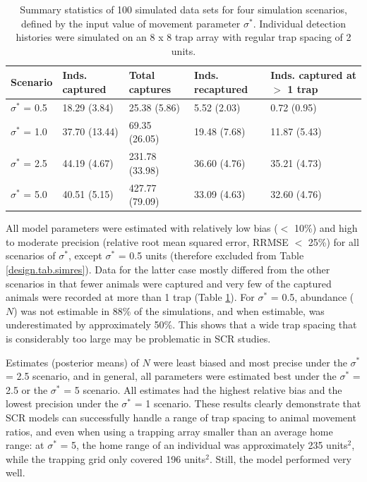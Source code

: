 \begin{table}[ht]
  \centering
  \caption{Summary statistics of 100 simulated data sets for four
    simulation scenarios, defined by the input value of movement
    parameter $\sigma^*$. Individual detection histories were
    simulated on an 8 x 8 trap array with regular trap spacing of 2
    units.}
    \begin{tabular}{l p{2.1cm} p{2.3cm}p{2.1cm}p{2.3cm}}
    \hline
    Scenario & Inds. \newline captured & Total \newline captures & Inds. \newline recaptured & Inds. captured  \newline at $>$ 1 trap \\ \hline
    {$\sigma^*$ = 0.5} & 18.29 (3.84) & 25.38 (5.86) & 5.52 (2.03) & 0.72 (0.95) \\
    {$\sigma^*$ = 1.0} & 37.70 (13.44) & 69.35 (26.05) & 19.48 (7.68) & 11.87 (5.43) \\
    {$\sigma^*$ = 2.5} & 44.19 (4.67) & 231.78 (33.98) & 36.60 (4.76) & 35.21 (4.73) \\
    {$\sigma^*$ = 5.0} & 40.51 (5.15) & 427.77 (79.09) & 33.09 (4.63)
    & 32.60 (4.76) \\ \hline
    \end{tabular}
  \label{design.tab.simdat}
\end{table}

All model parameters were
estimated with relatively
low bias ($<$ 10\%) and high to moderate precision (relative root
mean squared error, RRMSE $<$ 25\%)
for all scenarios of $\sigma^*$, except $\sigma^*$ = 0.5 units
(therefore excluded 
from Table \ref{design.tab.simres}). Data for the
latter case mostly differed from the other scenarios in that fewer
animals were captured and very few of the captured animals were
recorded at more than 1 trap (Table \ref{design.tab.simdat}). For
$\sigma^*$ = 0.5, abundance ($N$) was not
estimable 
in 88\% of the
simulations, and when estimable, was underestimated by
approximately 50\%. This shows that a wide trap spacing that is
considerably too large may be problematic in SCR studies.

Estimates (posterior means)
of $N$ were least biased and most precise under the
$\sigma^*$ = 2.5 scenario, and in general, all parameters were
estimated best under the $\sigma^*$ = 2.5 or the $\sigma^*$ = 5
scenario. All estimates had the highest relative bias and the lowest
precision under the $\sigma^*$ = 1 scenario.  These results clearly
demonstrate that SCR models can successfully handle a range of trap
spacing to animal movement ratios, and even when using a trapping
array smaller than an average home range: at $\sigma^*$ = 5, the home
range of an individual was approximately 235 units$^2$, while the
trapping grid only covered 196 units$^2$. Still, the model performed
very well.

